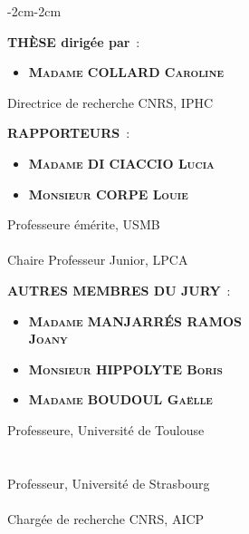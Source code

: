 \begin{changemargin}{-2cm}{-2cm}

{\large\bfseries THÈSE dirigée par}~: \bigskip

\begin{minipage}{0.5\linewidth}
\begin{itemize}
    \item[] {\bfseries\textsc{Madame COLLARD Caroline}}
\end{itemize}
\end{minipage} \hfill
\begin{minipage}{0.45\linewidth}
Directrice de recherche CNRS, IPHC
\end{minipage}
\bigskip
\bigskip

{\large\bfseries RAPPORTEURS}~: \bigskip

\begin{minipage}{0.5\linewidth}
\begin{itemize}
    \item[] {\bfseries\textsc{Madame DI CIACCIO Lucia}}
    \item[] {\bfseries\textsc{Monsieur CORPE Louie}}
\end{itemize}
\end{minipage} \hfill
\begin{minipage}{0.45\linewidth}
Professeure émérite, USMB \\ \\
Chaire Professeur Junior, LPCA
\end{minipage}
\bigskip


\noindent\makebox[\linewidth]{\rule{0.83\paperwidth}{0.4pt}}
\bigskip


{\large\bfseries AUTRES MEMBRES DU JURY}~: \bigskip

\begin{minipage}{0.5\linewidth}
\begin{itemize}
    \item[] {\bfseries\textsc{Madame MANJARR\'ES RAMOS \\ \qquad Joany}}
    \item[] {\bfseries\textsc{Monsieur HIPPOLYTE Boris}}
    \item[] {\bfseries\textsc{Madame BOUDOUL Gaëlle}}
\end{itemize}
\end{minipage} \hfill
\begin{minipage}{0.45\linewidth}
\vspace{0.8em}
Professeure, Université de Toulouse \\ \\ \\
Professeur, Université de Strasbourg \\ \\
Chargée de recherche CNRS, AICP
\end{minipage}


\end{changemargin}